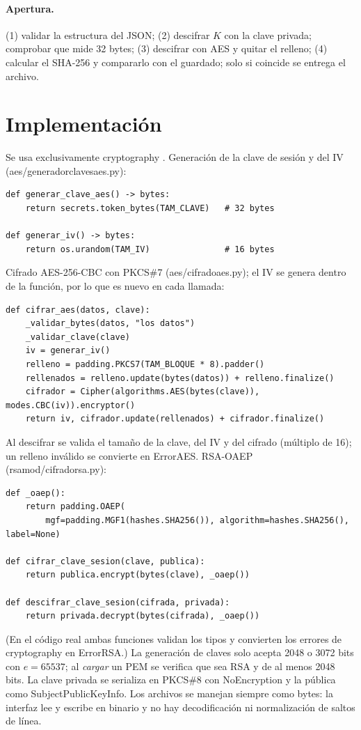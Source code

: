 \documentclass[11pt,a4paper]{article}
\newcommand{\cod}[1]{{\ttfamily\let\_\relax\def\_{\textunderscore\penalty0\hskip0pt\relax}\def\/{\slash\penalty0\hskip0pt\relax}#1}}
\begin{document}
\paragraph{Apertura.} (1) validar la estructura del JSON; (2) descifrar $K$ con la clave privada; comprobar
que mide 32 bytes; (3) descifrar con AES y quitar el relleno; (4) calcular el SHA-256 y compararlo con el
guardado; solo si coincide se entrega el archivo.

\section{Implementación}
Se usa exclusivamente \cod{cryptography} \cite{crypto}. Generación de la clave de sesión y del IV
(\cod{aes/generador\_claves\_aes.py}):
\begin{lstlisting}
def generar_clave_aes() -> bytes:
    return secrets.token_bytes(TAM_CLAVE)   # 32 bytes

def generar_iv() -> bytes:
    return os.urandom(TAM_IV)               # 16 bytes
\end{lstlisting}
Cifrado AES-256-CBC con PKCS\#7 (\cod{aes/cifrado\_aes.py}); el IV se genera dentro de la función, por lo que
es nuevo en cada llamada:
\begin{lstlisting}
def cifrar_aes(datos, clave):
    _validar_bytes(datos, "los datos")
    _validar_clave(clave)
    iv = generar_iv()
    relleno = padding.PKCS7(TAM_BLOQUE * 8).padder()
    rellenados = relleno.update(bytes(datos)) + relleno.finalize()
    cifrador = Cipher(algorithms.AES(bytes(clave)), modes.CBC(iv)).encryptor()
    return iv, cifrador.update(rellenados) + cifrador.finalize()
\end{lstlisting}
Al descifrar se valida el tamaño de la clave, del IV y del cifrado (múltiplo de 16); un relleno inválido se
convierte en \cod{ErrorAES}. RSA-OAEP (\cod{rsa\_mod/cifrado\_rsa.py}):
\begin{lstlisting}
def _oaep():
    return padding.OAEP(
        mgf=padding.MGF1(hashes.SHA256()), algorithm=hashes.SHA256(), label=None)

def cifrar_clave_sesion(clave, publica):
    return publica.encrypt(bytes(clave), _oaep())

def descifrar_clave_sesion(cifrada, privada):
    return privada.decrypt(bytes(cifrada), _oaep())
\end{lstlisting}
(En el código real ambas funciones validan los tipos y convierten los errores de \cod{cryptography} en
\cod{ErrorRSA}.) La generación de claves solo acepta 2048 o 3072 bits con $e=65537$; al \emph{cargar} un PEM
se verifica que sea RSA y de al menos 2048 bits. La clave privada se serializa en PKCS\#8 con
\cod{NoEncryption} y la pública como SubjectPublicKeyInfo. Los archivos se manejan siempre como \cod{bytes}:
la interfaz lee y escribe en binario y no hay decodificación ni normalización de saltos de línea.
\end{document}
